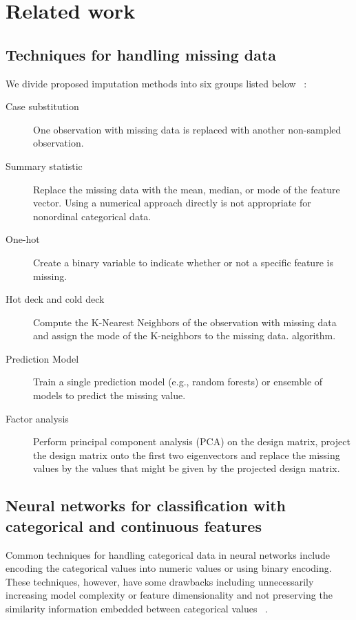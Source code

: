 \documentclass[10pt,twocolumn,letterpaper]{article}
\begin{document}
\section{Related work}  \label{section:rw}

\subsection{Techniques for handling missing data} \label{section:techniques}
We divide proposed  imputation methods into six groups listed
below ~\cite{batista2003analysis}:

\begin{description}
\item[Case substitution] One observation with missing data is replaced with
another non-sampled observation.
\item[Summary statistic] Replace the missing data with the mean, median, or mode of
    the feature vector. Using a numerical approach directly is not appropriate for nonordinal categorical data.
\item[One-hot] Create a binary variable to indicate whether or not a specific
    feature is missing. %
\item[Hot deck and cold deck] Compute the K-Nearest Neighbors of the
    observation with missing data and assign the mode of the K-neighbors
    to the missing data. %
    algorithm.
\item[Prediction Model] Train a single prediction model (e.g., random forests) or ensemble of models to predict the missing value. %
\item[Factor analysis] Perform principal component analysis (PCA) on the design
    matrix, project the design matrix onto the first two eigenvectors and
    replace the missing values by the values that might be given by the
    projected design matrix.
\end{description}

\subsection{Neural networks for classification with categorical and
continuous features}  Common techniques for handling categorical data in
neural networks include encoding the categorical values into numeric values
or using binary encoding. These techniques, however, have some drawbacks
including unnecessarily increasing model complexity or feature dimensionality
and not preserving the similarity information embedded between categorical
values ~\cite{hsu2006generalizing}.\\
\end{document}
